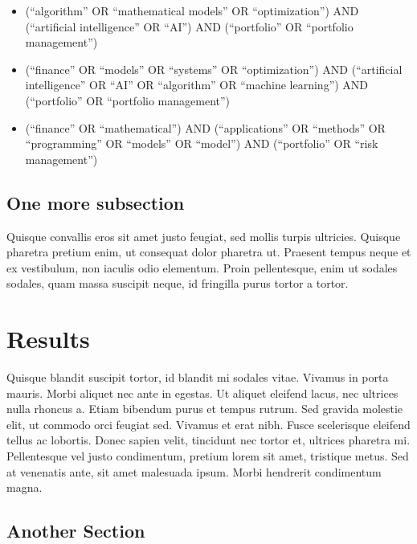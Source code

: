 \documentclass[12pt]{article}
\begin{document}
    \begin{itemize}
        \item (“algorithm” OR “mathematical models” OR “optimization”) AND (“artificial intelligence” OR “AI”) AND (“portfolio” OR “portfolio management”) 
        \item (“finance” OR “models” OR “systems” OR “optimization”) AND (“artificial intelligence” OR “AI” OR “algorithm” OR “machine learning”) AND (“portfolio” OR “portfolio management”) 
        \item (“finance” OR “mathematical”) AND (“applications” OR “methods” OR “programming” OR “models” OR “model”) AND (“portfolio” OR “risk management”)
    \end{itemize}
 
\subsection{One more subsection} 
    Quisque convallis eros sit amet justo feugiat, sed mollis turpis ultricies. Quisque pharetra pretium enim, ut consequat dolor pharetra ut. Praesent tempus neque et ex vestibulum, non iaculis odio elementum. Proin pellentesque, enim ut sodales sodales, quam massa suscipit neque, id fringilla purus tortor a tortor.

 


\section{Results}
    
    Quisque blandit suscipit tortor, id blandit mi sodales vitae. Vivamus in porta mauris. Morbi aliquet nec ante in egestas. Ut aliquet eleifend lacus, nec ultrices nulla rhoncus a. Etiam bibendum purus et tempus rutrum. Sed gravida molestie elit, ut commodo orci feugiat sed. Vivamus et erat nibh. Fusce scelerisque eleifend tellus ac lobortis. Donec sapien velit, tincidunt nec tortor et, ultrices pharetra mi. Pellentesque vel justo condimentum, pretium lorem sit amet, tristique metus. Sed at venenatis ante, sit amet malesuada ipsum. Morbi hendrerit condimentum magna.
    
\subsection{Another Section}
\end{document}
